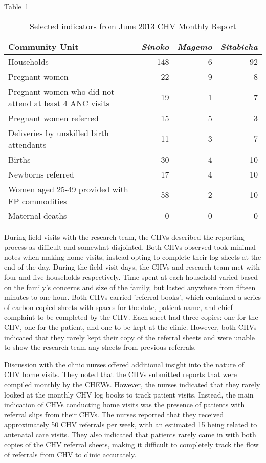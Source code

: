 Table~\ref{tab:chvreport}
\begin{table}[]
  \centering
  \caption{Selected indicators from June 2013 CHV Monthly Report}
    \begin{tabular}{lrrr}
    \toprule
    \textbf{Community Unit} & \textit{Sinoko} & \textit{Magemo} & \textit{Sitabicha} \\
    \midrule
    Households & 148   & 6     & 92 \\
    Pregnant women & 22    & 9     & 8 \\
    Pregnant women who did not attend at least 4 ANC visits & 19    & 1     & 7 \\
    Pregnant women referred & 15    & 5     & 3 \\
    Deliveries by unskilled birth attendants & 11    & 3     & 7 \\
    Births & 30    & 4     & 10 \\
    Newborns referred & 17    & 4     & 10 \\
    Women aged 25-49 provided with FP commodities & 58    & 2     & 10 \\
    Maternal deaths & 0     & 0     & 0 \\
    \bottomrule
    \end{tabular}%
  \label{tab:chvreport}%
\end{table}%


During field visits with the research team, the CHVs described the reporting process as difficult and somewhat disjointed. Both CHVs observed took minimal notes when making home visits, instead opting to complete their log sheets at the end of the day. During the field visit days, the CHVs and research team met with four and five households respectively. Time spent at each household varied based on the family's concerns and size of the family, but lasted anywhere from fifteen minutes to one hour. Both CHVs carried 'referral books', which contained a series of carbon-copied sheets with spaces for the date, patient name, and chief complaint to be completed by the CHV. Each sheet had three copies: one for the CHV, one for the patient, and one to be kept at the clinic. However, both CHVs indicated that they rarely kept their copy of the referral sheets and were unable to show the research team any sheets from previous referrals. 

Discussion with the clinic nurses offered additional insight into the nature of CHV home visits. They noted that the CHVs submitted reports that were compiled monthly by the CHEWs. However, the nurses indicated that they rarely looked at the monthly CHV log books to track patient visits. Instead, the main indication of CHVs conducting home visits was the presence of patients with referral slips from their CHVs. The nurses reported that they received approximately 50 CHV referrals per week, with an estimated 15 being related to antenatal care visits. They also indicated that patients rarely came in with both copies of the CHV referral sheets, making it difficult to completely track the flow of referrals from CHV to clinic accurately. 

